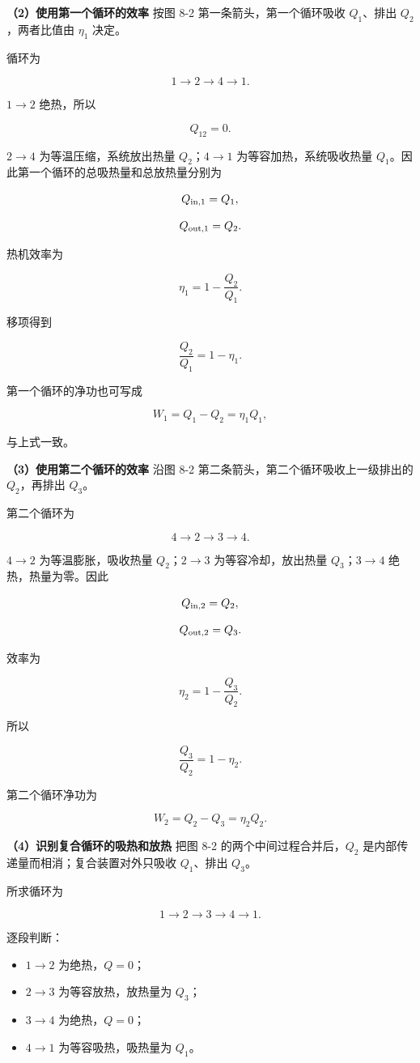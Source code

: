 \documentclass[12pt,a4paper,UTF8]{ctexart}
\newcommand{\tightlist}{\setlength{\itemsep}{0pt}\setlength{\parskip}{0pt}}
\begin{document}
\textbf{（2）使用第一个循环的效率} 按图 8-2 第一条箭头，第一个循环吸收
\(Q_1\)、排出 \(Q_2\)，两者比值由 \(\eta_1\) 决定。

循环为

\[1\to2\to4\to1.\]

\(1\to2\) 绝热，所以

\[Q_{12}=0.\]

\(2\to4\) 为等温压缩，系统放出热量 \(Q_2\)；\(4\to1\)
为等容加热，系统吸收热量
\(Q_1\)。因此第一个循环的总吸热量和总放热量分别为

\[Q_{{\rm in},1}=Q_1,\]

\[Q_{{\rm out},1}=Q_2.\]

热机效率为

\[\eta_1=1-\frac{Q_2}{Q_1}.\]

移项得到

\[\boxed{\frac{Q_2}{Q_1}=1-\eta_1}.\]

第一个循环的净功也可写成

\[W_1=Q_1-Q_2=\eta_1Q_1,\]

与上式一致。

\textbf{（3）使用第二个循环的效率} 沿图 8-2
第二条箭头，第二个循环吸收上一级排出的 \(Q_2\)，再排出 \(Q_3\)。

第二个循环为

\[4\to2\to3\to4.\]

\(4\to2\) 为等温膨胀，吸收热量 \(Q_2\)；\(2\to3\) 为等容冷却，放出热量
\(Q_3\)；\(3\to4\) 绝热，热量为零。因此

\[Q_{{\rm in},2}=Q_2,\]

\[Q_{{\rm out},2}=Q_3.\]

效率为

\[\eta_2=1-\frac{Q_3}{Q_2}.\]

所以

\[\boxed{\frac{Q_3}{Q_2}=1-\eta_2}.\]

第二个循环净功为

\[W_2=Q_2-Q_3=\eta_2Q_2.\]

\textbf{（4）识别复合循环的吸热和放热} 把图 8-2
的两个中间过程合并后，\(Q_2\) 是内部传递量而相消；复合装置对外只吸收
\(Q_1\)、排出 \(Q_3\)。

所求循环为

\[1\to2\to3\to4\to1.\]

逐段判断：

\begin{itemize}
\tightlist
\item
  \(1\to2\) 为绝热，\(Q=0\)；
\item
  \(2\to3\) 为等容放热，放热量为 \(Q_3\)；
\item
  \(3\to4\) 为绝热，\(Q=0\)；
\item
  \(4\to1\) 为等容吸热，吸热量为 \(Q_1\)。
\end{itemize}
\end{document}
